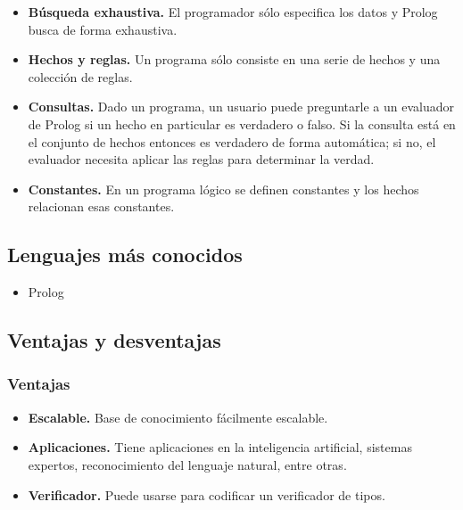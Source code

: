 \documentclass{article}
\begin{document}
\begin{itemize}

\item \textbf{Búsqueda exhaustiva.} El programador sólo especifica los datos y Prolog busca de forma exhaustiva.

\item \textbf{Hechos y reglas.} Un programa sólo consiste en una serie de hechos y una colección de reglas.

\item \textbf{Consultas.} Dado un programa, un usuario puede preguntarle a un evaluador de Prolog si un hecho en particular es verdadero o falso. Si la consulta está en el conjunto de hechos entonces es verdadero de forma automática; si no, el evaluador necesita aplicar las reglas para determinar la verdad.

\item \textbf{Constantes.} En un programa lógico se definen constantes y los hechos relacionan esas constantes.

\end{itemize}

\subsection{Lenguajes más conocidos}

\begin{itemize}
\item Prolog
\end{itemize}

\subsection{Ventajas y desventajas}

\subsubsection*{Ventajas}

\begin{itemize}
\item \textbf{Escalable.} Base de conocimiento fácilmente escalable.

\item \textbf{Aplicaciones.} Tiene aplicaciones en la inteligencia artificial, sistemas expertos, reconocimiento del lenguaje natural, entre otras.

\item \textbf{Verificador.} Puede usarse para codificar un verificador de tipos.

\end{itemize}
\end{document}

